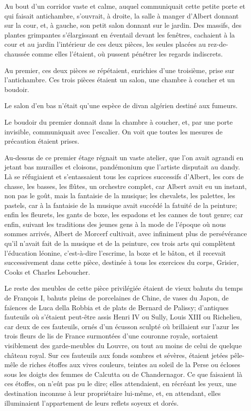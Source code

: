 Au bout d'un corridor vaste et calme, auquel communiquait cette petite porte et qui faisait antichambre, s'ouvrait, à droite, la salle à manger d'Albert donnant sur la cour, et, à gauche, son petit salon donnant sur le jardin. Des massifs, des plantes grimpantes s'élargissant en éventail devant les fenêtres, cachaient à la cour et au jardin l'intérieur de ces deux pièces, les seules placées au rez-de-chaussée comme elles l'étaient, où pussent pénétrer les regards indiscrets. 

Au premier, ces deux pièces se répétaient, enrichies d'une troisième, prise sur l'antichambre. Ces trois pièces étaient un salon, une chambre à coucher et un boudoir.  

Le salon d'en bas n'était qu'une espèce de divan algérien destiné aux fumeurs. 

Le boudoir du premier donnait dans la chambre à coucher, et, par une porte invisible, communiquait avec l'escalier. On voit que toutes les mesures de précaution étaient prises. 

Au-dessus de ce premier étage régnait un vaste atelier, que l'on avait agrandi en jetant bas murailles et cloisons, pandémonium que l'artiste disputait au dandy. Là se réfugiaient et s'entassaient tous les caprices successifs d'Albert, les cors de chasse, les basses, les flûtes, un orchestre complet, car Albert avait eu un instant, non pas le goût, mais la fantaisie de la musique; les chevalets, les palettes, les pastels, car à la fantaisie de la musique avait succédé la fatuité de la peinture; enfin les fleurets, les gants de boxe, les espadons et les cannes de tout genre; car enfin, suivant les traditions des jeunes gens à la mode de l'époque où nous sommes arrivés, Albert de Morcerf cultivait, avec infiniment plus de persévérance qu'il n'avait fait de la musique et de la peinture, ces trois arts qui complètent l'éducation léonine, c'est-à-dire l'escrime, la boxe et le bâton, et il recevait successivement dans cette pièce, destinée à tous les exercices du corps, Grisier, Cooks et Charles Leboucher. 

Le reste des meubles de cette pièce privilégiée étaient de vieux bahuts du temps de François I\ier, bahuts pleins de porcelaines de Chine, de vases du Japon, de faïences de Luca della Robbia et de plats de Bernard de Palissy; d'antiques fauteuils où s'étaient peut-être assis Henri IV ou Sully, Louis XIII ou Richelieu, car deux de ces fauteuils, ornés d'un écusson sculpté où brillaient sur l'azur les trois fleurs de lis de France surmontées d'une couronne royale, sortaient visiblement des garde-meubles du Louvre, ou tout au moins de celui de quelque château royal. Sur ces fauteuils aux fonds sombres et sévères, étaient jetées pêle-mêle de riches étoffes aux vives couleurs, teintes au soleil de la Perse ou écloses sous les doigts des femmes de Calcutta ou de Chandernagor. Ce que faisaient là ces étoffes, on n'eût pas pu le dire; elles attendaient, en récréant les yeux, une destination inconnue à leur propriétaire lui-même, et, en attendant, elles illuminaient l'appartement de leurs reflets soyeux et dorés. 

